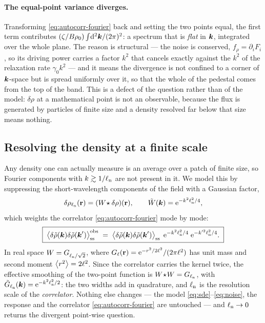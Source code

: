 \documentclass[a5paper]{article}
\begin{document}
\paragraph{The equal-point variance diverges.} Transforming \eqref{eq:autocorr-fourier} back and setting the two points equal, the first term contributes $(\zeta/B\rho_0)\int\!\mathrm{d}^2\boldsymbol{k}/(2\pi)^2$: a spectrum that is \emph{flat} in $\boldsymbol{k}$, integrated over the whole plane. The reason is structural --- the noise is conserved, $f_\rho = \partial_iF_i$, so its driving power carries a factor $k^2$ that cancels exactly against the $k^2$ of the relaxation rate $\gamma_0k^2$ --- and it means the divergence is not confined to a corner of $\boldsymbol{k}$-space but is spread uniformly over it, so that the whole of the pedestal comes from the top of the band. This is a defect of the question rather than of the model: $\delta\rho$ at a mathematical point is not an observable, because the flux is generated by particles of finite size and a density resolved far below that size means nothing.

\subsection{Resolving the density at a finite scale}
\label{sec-cutoff}

Any density one can actually measure is an average over a patch of finite size, so Fourier components with $k\gtrsim1/\ell_{\rm n}$ are not present in it. We model this by suppressing the short-wavelength components of the field with a Gaussian factor,
\begin{equation}
    \label{eq:smoothing-kernel}
    \delta\rho_{\ell_{\rm n}}(\mathbf{r}) = (W\!\star\delta\rho)(\mathbf{r}),
    \qquad
    \tilde W(\boldsymbol{k}) = \mathrm{e}^{-k^2\ell_{\rm n}^2/4},
\end{equation}
which weights the correlator \eqref{eq:autocorr-fourier} mode by mode:
\begin{equation}
    \label{eq:weight}
    \boxed{\;
    \left\langle\delta\tilde\rho(\boldsymbol{k})\delta\tilde\rho(\boldsymbol{k}')\right\rangle^\text{obs}_{\mathrm{ss}}
    \;=\;
    \left\langle\delta\tilde\rho(\boldsymbol{k})\delta\tilde\rho(\boldsymbol{k}')\right\rangle_{\mathrm{ss}}\;
    \mathrm{e}^{-k^2\ell_{\rm n}^2/4}\;\mathrm{e}^{-k'^2\ell_{\rm n}^2/4}.
    \;}
\end{equation}
In real space $W = G_{\ell_{\rm n}/\sqrt2}$, where $G_\ell(\mathbf{r}) = \mathrm{e}^{-r^2/2\ell^2}/(2\pi\ell^2)$ has unit mass and second moment $\left\langle r^2\right\rangle = 2\ell^2$. Since the correlator carries the kernel twice, the effective smoothing of the two-point function is $W\!\star\!W = G_{\ell_{\rm n}}$, with $\tilde G_{\ell_{\rm n}}(\boldsymbol{k}) = \mathrm{e}^{-k^2\ell_{\rm n}^2/2}$: the two widths add in quadrature, and $\ell_{\rm n}$ is the resolution scale of the \emph{correlator}. Nothing else changes --- the model \eqref{eq:sde}--\eqref{eq:noise}, the response and the correlator \eqref{eq:autocorr-fourier} are untouched --- and $\ell_{\rm n}\to0$ returns the divergent point-wise question.
\end{document}
